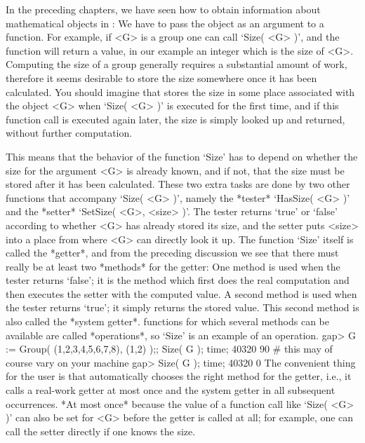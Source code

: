 



In the  preceding chapters, we have  seen how to obtain information about
mathematical objects in {\GAP}: We have to pass the object as an argument
to a function. For example, if <G> is a group one can call
`Size( <G> )', and the function will return a value,
in our example an integer  which is the  size of <G>. Computing
the size  of a  group generally  requires  a substantial amount  of work,
therefore it seems desirable to store the size somewhere once it has been
calculated. You should imagine that {\GAP} stores  the size in some place
associated  with the object  <G> when `Size( <G>  )'  is executed for the
first time, and if this function  call is executed  again later, the size
is simply looked up and returned, without further computation.

%
%
This means that the  behavior  of the  function  `Size' has to  depend on
whether the size for the argument <G> is already known,  and if not, that
the size  must be  stored after it  has been  calculated. These two extra
tasks are  done  by two other   functions that accompany `Size(   <G> )',
namely the *tester* `HasSize( <G> )'
and the *setter* `SetSize( <G>, <size> )'.
The tester returns `true' or `false' according to
whether <G> has already stored its size, and the setter puts <size> into
a place from where <G> can directly look it up.
The function `Size' itself is called the *getter*,
and from the preceding discussion we see
that there must really be at least two *methods* for the getter:
One method is used when the tester returns `false';
it is the method which first does the real computation and then executes
the setter with the computed value.
A second method is used when the tester returns `true';
it simply returns the stored value.
This second method is also called the *system getter*.
{\GAP} functions for which several methods can be available
are called *operations*, so `Size' is an example of an operation.
\begintt
gap> G := Group( (1,2,3,4,5,6,7,8), (1,2) );; Size( G ); time;
40320
90   # this may of course vary on your machine
gap> Size( G ); time;
40320
0
\endtt
The convenient thing  for the user  is that  {\GAP} automatically chooses
the right method  for the getter, i.e.,  it calls a real-work getter at
most once  and the system getter  in all subsequent occurrences. *At most
once* because the value of a function call like `Size( <G> )' can also be
set for <G>  before the getter  is called at all;
for example, one can call the setter directly if one knows the size.

